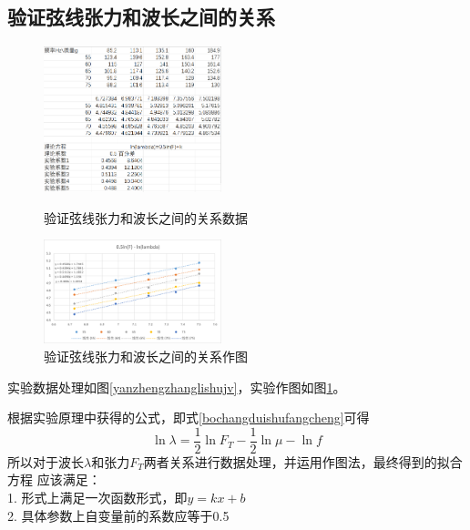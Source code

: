 \documentclass{ctexart}
\begin{document}
  \subsection{验证弦线张力和波长之间的关系}
  \begin{figure}[b]
    \centering
    \begin{minipage}[b]{0.48\textwidth}
      \centering
      \includegraphics[width=0.46\textwidth]{yanzhengzhanglishujv.png}
      \caption{验证弦线张力和波长之间的关系数据}\label{yanzhengzhanglishujv}
    \end{minipage}
    \begin{minipage}[b]{0.48\textwidth}
      \centering
      \includegraphics[width=0.46\textwidth]{yanzhengzhanglizuotu.png}
      \caption{验证弦线张力和波长之间的关系作图}\label{yanzhengzhanglizuotu}
    \end{minipage}
  \end{figure}

  实验数据处理如图\ref{yanzhengzhanglishujv}，实验作图如图\ref{yanzhengzhanglizuotu}。

  根据实验原理中获得的公式，即式\ref{bochangduishufangcheng}可得
  $$\ln \lambda = \frac{1}{2} \ln F_{T}-\frac{1}{2} \ln \mu - \ln f$$
  所以对于波长$\lambda$和张力$F_{T}$两者关系进行数据处理，并运用作图法，最终得到的拟合方程
  应该满足：\\
  1. 形式上满足一次函数形式，即$y=kx+b$\\
  2. 具体参数上自变量前的系数应等于0.5
\end{document}
